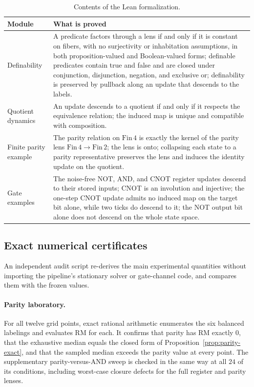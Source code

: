 \begin{table}[h]
    \centering
    \caption{Contents of the Lean formalization.}
    \label{tab:lean}
    {\small
    \renewcommand{\arraystretch}{1.15}
    \begin{tabularx}{\linewidth}{@{}l >{\raggedright\arraybackslash}X@{}}
    \toprule
    Module & What is proved \\
    \midrule
    Definability & A predicate factors through a lens if and only if it is constant on fibers, with no surjectivity or inhabitation assumptions, in both proposition-valued and Boolean-valued forms; definable predicates contain true and false and are closed under conjunction, disjunction, negation, and exclusive or; definability is preserved by pullback along an update that descends to the labels. \\
    Quotient dynamics & An update descends to a quotient if and only if it respects the equivalence relation; the induced map is unique and compatible with composition. \\
    Finite parity example & The parity relation on \(\mathrm{Fin}\,4\) is exactly the kernel of the parity lens \(\mathrm{Fin}\,4\to\mathrm{Fin}\,2\); the lens is onto; collapsing each state to a parity representative preserves the lens and induces the identity update on the quotient. \\
    Gate examples & The noise-free NOT, AND, and CNOT register updates descend to their stored inputs; CNOT is an involution and injective; the one-step CNOT update admits no induced map on the target bit alone, while two ticks do descend to it; the NOT output bit alone does not descend on the whole state space. \\
    \bottomrule
    \end{tabularx}
    }
\end{table}

\subsection{Exact numerical certificates}

An independent audit script re-derives the main experimental quantities without importing the pipeline's stationary solver or gate-channel code, and compares them with the frozen values.

\paragraph{Parity laboratory.} For all twelve grid points, exact rational arithmetic enumerates the six balanced labelings and evaluates RM for each. It confirms that parity has RM exactly \(0\), that the exhaustive median equals the closed form of Proposition~\ref{prop:parity-exact}, and that the sampled median exceeds the parity value at every point. The supplementary parity-versus-AND sweep is checked in the same way at all \(24\) of its conditions, including worst-case closure defects for the full register and parity lenses.

